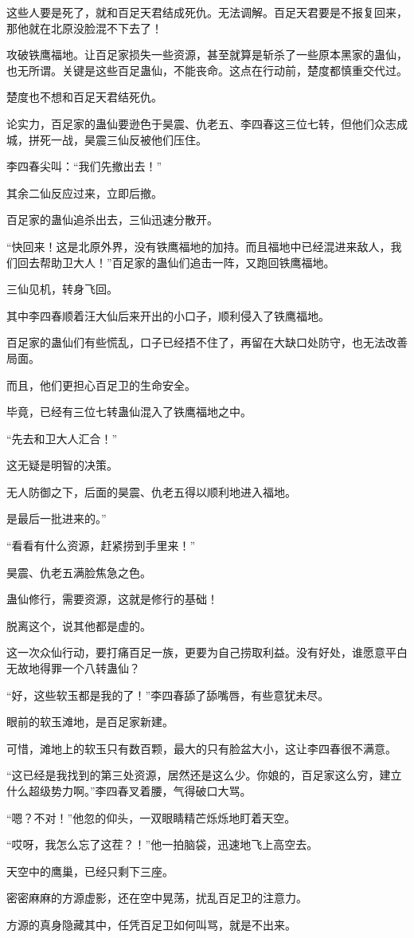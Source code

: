 \begin{this_body}
这些人要是死了，就和百足天君结成死仇。无法调解。百足天君要是不报复回来，那他就在北原没脸混不下去了！

攻破铁鹰福地。让百足家损失一些资源，甚至就算是斩杀了一些原本黑家的蛊仙，也无所谓。关键是这些百足蛊仙，不能丧命。这点在行动前，楚度都慎重交代过。

楚度也不想和百足天君结死仇。

论实力，百足家的蛊仙要逊色于昊震、仇老五、李四春这三位七转，但他们众志成城，拼死一战，昊震三仙反被他们压住。

李四春尖叫：“我们先撤出去！”

其余二仙反应过来，立即后撤。

百足家的蛊仙追杀出去，三仙迅速分散开。

“快回来！这是北原外界，没有铁鹰福地的加持。而且福地中已经混进来敌人，我们回去帮助卫大人！”百足家的蛊仙们追击一阵，又跑回铁鹰福地。

三仙见机，转身飞回。

其中李四春顺着汪大仙后来开出的小口子，顺利侵入了铁鹰福地。

百足家的蛊仙们有些慌乱，口子已经捂不住了，再留在大缺口处防守，也无法改善局面。

而且，他们更担心百足卫的生命安全。

毕竟，已经有三位七转蛊仙混入了铁鹰福地之中。

“先去和卫大人汇合！”

这无疑是明智的决策。

无人防御之下，后面的昊震、仇老五得以顺利地进入福地。

是最后一批进来的。”

“看看有什么资源，赶紧捞到手里来！”

昊震、仇老五满脸焦急之色。

蛊仙修行，需要资源，这就是修行的基础！

脱离这个，说其他都是虚的。

这一次众仙行动，要打痛百足一族，更要为自己捞取利益。没有好处，谁愿意平白无故地得罪一个八转蛊仙？

“好，这些软玉都是我的了！”李四春舔了舔嘴唇，有些意犹未尽。

眼前的软玉滩地，是百足家新建。

可惜，滩地上的软玉只有数百颗，最大的只有脸盆大小，这让李四春很不满意。

“这已经是我找到的第三处资源，居然还是这么少。你娘的，百足家这么穷，建立什么超级势力啊。”李四春叉着腰，气得破口大骂。

“嗯？不对！”他忽的仰头，一双眼睛精芒烁烁地盯着天空。

“哎呀，我怎么忘了这茬？！”他一拍脑袋，迅速地飞上高空去。

天空中的鹰巢，已经只剩下三座。

密密麻麻的方源虚影，还在空中晃荡，扰乱百足卫的注意力。

方源的真身隐藏其中，任凭百足卫如何叫骂，就是不出来。

\end{this_body}
